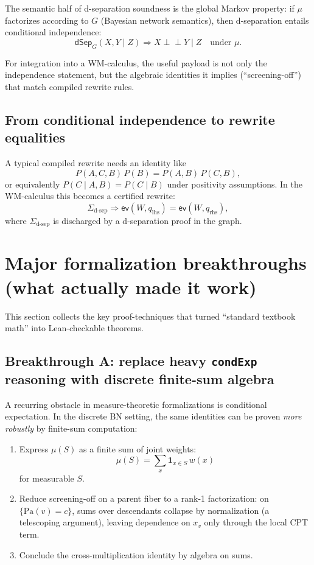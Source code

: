 \documentclass[11pt]{article}
\newcommand{\side}{\ensuremath{\Sigma}}
\newcommand{\ev}{\mathsf{ev}}
\newcommand{\dsep}{\mathsf{dSep}}
\newcommand{\CI}{\perp\!\!\!\perp}
\begin{document}
The semantic half of d-separation soundness is the global Markov property:
if $\mu$ factorizes according to $G$ (Bayesian network semantics),
then d-separation entails conditional independence:
\[
  \dsep_G(X,Y\mid Z) \Rightarrow X \CI Y \mid Z \quad \text{under } \mu.
\]

For integration into a WM-calculus, the useful payload is not only the independence statement,
but the algebraic identities it implies (``screening-off'') that match compiled rewrite rules.

\subsection{From conditional independence to rewrite equalities}

A typical compiled rewrite needs an identity like
\[
  P(A,C,B)\,P(B) = P(A,B)\,P(C,B),
\]
or equivalently $P(C\mid A,B)=P(C\mid B)$ under positivity assumptions.
In the WM-calculus this becomes a certified rewrite:
\[
  \side_{\text{d-sep}} \Rightarrow \ev(W, q_{\text{lhs}}) = \ev(W, q_{\text{rhs}}),
\]
where $\side_{\text{d-sep}}$ is discharged by a d-separation proof in the graph.

\section{Major formalization breakthroughs (what actually made it work)}

This section collects the key proof-techniques that turned ``standard textbook math'' into Lean-checkable theorems.

\subsection{Breakthrough A: replace heavy \texttt{condExp} reasoning with discrete finite-sum algebra}

A recurring obstacle in measure-theoretic formalizations is conditional expectation.
In the discrete BN setting, the same identities can be proven \emph{more robustly} by finite-sum computation:

\begin{enumerate}[leftmargin=2em]
\item Express $\mu(S)$ as a finite sum of joint weights:
\[
  \mu(S) = \sum_{x} \mathbf{1}_{x\in S}\,w(x)
\]
for measurable $S$.
\item Reduce screening-off on a parent fiber to a rank-1 factorization:
on $\{\mathrm{Pa}(v)=c\}$, sums over descendants collapse by normalization (a telescoping argument),
leaving dependence on $x_v$ only through the local CPT term.
\item Conclude the cross-multiplication identity by algebra on sums.
\end{enumerate}
\end{document}
